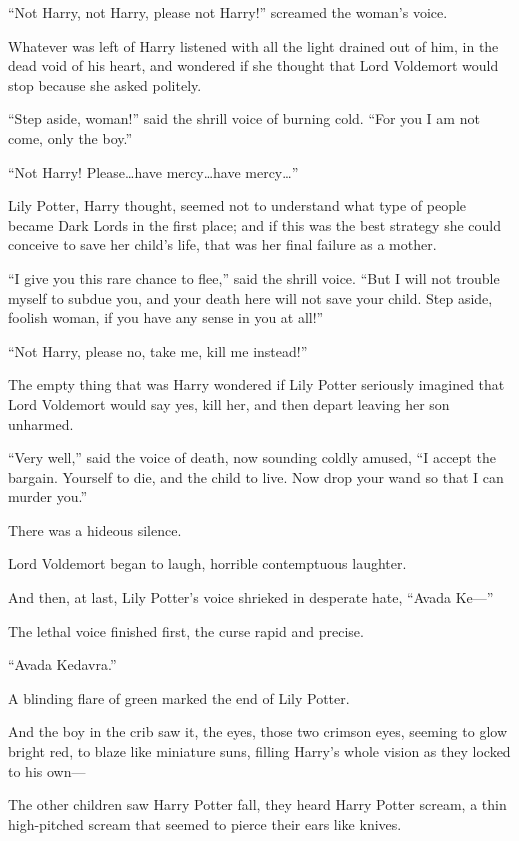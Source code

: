 \begin{em}
“Not Harry, not Harry, please not Harry!” screamed the woman’s voice.

Whatever was left of Harry listened with all the light drained out of him, in the dead void of his heart, and wondered if she thought that Lord Voldemort would stop because she asked politely.

“Step aside, woman!” said the shrill voice of burning cold. “For you I am not come, only the boy.”

“Not Harry! Please…have mercy…have mercy…”

Lily Potter, Harry thought, seemed not to understand what type of people became Dark Lords in the first place; and if this was the best strategy she could conceive to save her child’s life, that was her final failure as a mother.

“I give you this rare chance to flee,” said the shrill voice. “But I will not trouble myself to subdue you, and your death here will not save your child. Step aside, foolish woman, if you have any sense in you at all!”

“Not Harry, please no, take me, kill me instead!”

The empty thing that was Harry wondered if Lily Potter seriously imagined that Lord Voldemort would say yes, kill her, and then depart leaving her son unharmed.

“Very well,” said the voice of death, now sounding coldly amused, “I accept the bargain. Yourself to die, and the child to live. Now drop your wand so that I can murder you.”

There was a hideous silence.

Lord Voldemort began to laugh, horrible contemptuous laughter.

And then, at last, Lily Potter’s voice shrieked in desperate hate, “Avada Ke—”

The lethal voice finished first, the curse rapid and precise.

“Avada Kedavra.”

A blinding flare of green marked the end of Lily Potter.

And the boy in the crib saw it, the eyes, those two crimson eyes, seeming to glow bright red, to blaze like miniature suns, filling Harry’s whole vision as they locked to his own— \end{em}

\later

The other children saw Harry Potter fall, they heard Harry Potter scream, a thin high-pitched scream that seemed to pierce their ears like knives.

